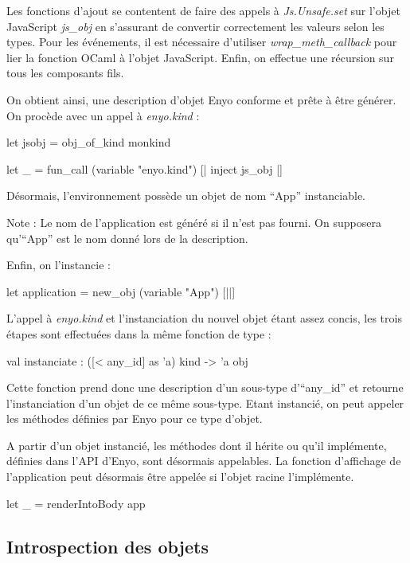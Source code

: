 \documentclass[11pt,a4paper]{report}
\begin{document}
Les fonctions d'ajout se contentent de faire des appels à 
\emph{Js.Unsafe.set} sur l'objet JavaScript \emph{js\_obj} en s'assurant de convertir
correctement les valeurs selon les types. Pour les événements, il est nécessaire
d'utiliser \emph{wrap\_meth\_callback} pour lier la fonction OCaml à l'objet JavaScript.
Enfin, on effectue une récursion sur tous les composants fils.

On obtient ainsi, une description d'objet Enyo conforme et prête à être générer.
On procède avec un appel à \emph{enyo.kind} :

\begin{OCaml}
  let jsobj = obj_of_kind monkind
  
  let _ = fun_call (variable "enyo.kind") [| inject js_obj |]
\end{OCaml}

Désormais, l'environnement possède un objet de nom ``App'' instanciable.

Note : Le nom de l'application est généré si il n'est pas fourni. On supposera qu'``App'' est
le nom donné lors de la description.

Enfin, on l'instancie :
\begin{OCaml}
  let application = new_obj (variable "App") [||]
\end{OCaml}

L'appel à \emph{enyo.kind} et l'instanciation du nouvel objet étant assez concis,
les trois étapes sont effectuées dans la même fonction de type : 
\begin{OCaml}
  val instanciate : ([< any_id] as 'a) kind -> 'a obj
\end{OCaml}

Cette fonction prend donc une description d'un sous-type d'``any\_id'' et retourne 
l'instanciation d'un objet de ce même sous-type. Etant instancié, on peut appeler les méthodes
définies par Enyo pour ce type d'objet.


A partir d'un objet instancié, les méthodes dont il hérite ou qu'il implémente, définies dans l'API d'Enyo,
sont désormais appelables. La fonction d'affichage de l'application peut désormais être appelée si
l'objet racine l'implémente.

\begin{OCaml}
  let _ = renderIntoBody app
\end{OCaml}

\subsection{Introspection des objets}\label{introspec}
\end{document}
